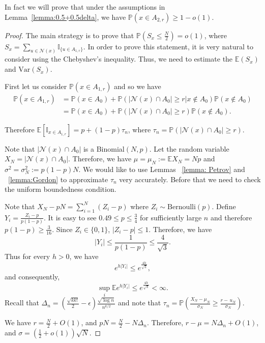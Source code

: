 \documentclass[reqno,11pt]{amsart}
\renewcommand{\leq}{\leqslant}
\renewcommand{\geq}{\geqslant}
\begin{document}
In fact we will prove that under the assumptions in Lemma~\ref{lemma:0.5+0.5delta}, we have $\mathbb{P}(x \in A_{2,r}) \geq 1-o(1).$
\begin{proof} 
The main strategy is to prove that $\mathbb{P}(S_x \leq \frac{N}{2})=o(1)$, where $S_x=\sum_{u \in \mathcal{N}(x)} \mathbb{I}_{\{u \in A_{1,r}\}}$. In order to prove this statement, it is very natural to consider using the Chebyshev's inequality. Thus, we need to estimate the
$\mathbb{E}(S_x)$ and $\text{Var}(S_x)$. 


First let us consider $\mathbb{P}(x \in A_{1,r})$ and so we have 
\begin{align*}
    \mathbb{P}(x \in A_{1,r}) &=\mathbb{P}(x \in A_0)+\mathbb{P}(|\mathcal{N}(x) \cap A_0| \geq r | x \notin A_0) \mathbb{P}(x \notin A_0)\\
    & = \mathbb{P}(x \in A_0)+\mathbb{P}(|\mathcal{N}(x) \cap A_0| \geq r) \mathbb{P}(x \notin A_0).
\end{align*}

Therefore $\mathbb{E}[\mathbb{I}_{x \in A_{1,r}}]=p+(1-p) \tau_n$, where $\tau_n=\mathbb{P}(|\mathcal{N}(x) \cap A_0| \geq r)$. 

Note that $|\mathcal{N}(x) \cap A_0|$ is a Binomial$(N,p)$. Let the random variable $X_N=|\mathcal{N}(x) \cap A_0|$.  Therefore, we have 
$\mu=\mu_N:=\mathbb{E}X_N=Np$ and $\sigma^2=\sigma_N^2:=p(1-p)N$. We would like to use Lemmas ~\ref{lemma: Petrov} and ~\ref{lemma:Gordon} to approximate $\tau_n$ very accurately. Before that we need to check the uniform boundedness condition. 

Note that $X_N-pN=\sum_{i=1}^{N} (Z_{i}-p)$ where $Z_i \sim \text{Bernoulli}(p)$. Define $Y_{i}=\frac{Z_{i}-p}{p(1-p)}$. It is easy to see $ 0.49 \leq p \leq \frac{3}{4}$ for sufficiently large $n$ and therefore $p(1-p) \geq \frac{3}{16}$. Since $Z_{i} \in \{0,1\}$, $|Z_{i}-p| \leq 1$. Therefore, we have 
$$|Y_{i}| \leq \frac{1}{p(1-p)} \leq \frac{4}{\sqrt{3}}.$$
Thus for every $h >0$, we have 
$$e^{h |Y_{i}|} \leq e^{\frac{4h}{\sqrt{3}}},$$
and consequently, 
$$\sup_{i}\mathbb{E}e^{h |Y_{i}|} \leq e^{\frac{4h}{\sqrt{3}}} < \infty.$$
Recall that $\Delta_n=\left(\frac{\sqrt{kk!}}{2}-\epsilon \right)\frac{\sqrt{\log n}}{n^{k/2}}$ and note that 
$\tau_n = \mathbb{P}\left(\frac{X_N-\mu_N}{\sigma_N} \geq \frac{r-\,u_N}{\sigma_N}\right)$. 

We have $r=\frac{N}{2}+O(1)$, and $pN=\frac{N}{2}-N\Delta_n$. Therefore, 
$r-\mu=N\Delta_n+O(1)$, and  $\sigma=(\frac{1}{2}+o(1))\sqrt{N}.$


\end{proof}
\end{document}
